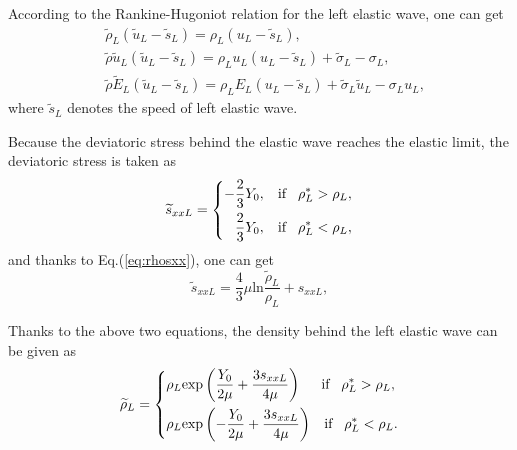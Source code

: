\documentclass[review]{elsarticle}
\begin{document}
 According to the Rankine-Hugoniot relation for the left  elastic wave, one can  get
  \begin{align}
    &\widetilde{\rho}_L(\widetilde{u}_L-\widetilde{s}_L) = \rho_L(u_L-\widetilde{s}_L), \label{eq:RHp1}\\
    &\widetilde{\rho}\widetilde{u}_L(\widetilde{u}_L-\widetilde{s}_L) = \rho_Lu_L(u_L-\widetilde{s}_L)+\widetilde{\sigma}_L-\sigma_L,  \label{eq:RHp2}\\
    &\widetilde{\rho}\widetilde{E}_L(\widetilde{u}_L-\widetilde{s}_L) = \rho_LE_L(u_L-\widetilde{s}_L)+\widetilde{\sigma}_L \widetilde{u}_L-\sigma_Lu_L, \label{eq:RHp3}
\end{align}
where $\widetilde{s}_L$ denotes the speed of left elastic wave.

Because the deviatoric stress behind the elastic wave reaches the elastic limit, the deviatoric stress is taken as
\begin{equation}
  \widetilde{s}_{xxL} =\left\{ \begin{aligned}
      -\frac{2}{3}Y_0, \hspace{0.3cm} \text{if} \hspace{0.3cm} \rho_L^* > \rho_L,\\
      \frac{2}{3}Y_0, \hspace{0.3cm} \text{if} \hspace{0.3cm} \rho_L^* < \rho_L,\\
    \end{aligned}\right.
  \end{equation}
  and thanks to Eq.(\ref{eq:rhosxx}), one can get
  \begin{equation}
	\widetilde{s}_{xxL} = \frac{4}{3}\mu \text{ln} \frac{\widetilde {\rho}_L}{\rho_L} +s_{xxL},
  \end{equation}

Thanks to the above two equations, the density behind the left elastic wave can be given as
\begin{equation}   \widetilde{\rho}_{L} = \left\{ \begin{aligned}
      & \rho_L \text{exp}\left(\frac{Y_0}{2\mu}+\frac{3 s_{xxL}}{4\mu}\right)  \hspace{0.5cm} \text{if} \hspace{0.3cm} \rho_L^* > \rho_L,\\
& \rho_L \text{exp}\left(-\frac{Y_0}{2\mu}+\frac{3 s_{xxL}}{4\mu}\right)
\hspace{0.3cm} \text{if} \hspace{0.3cm} \rho_L^* < \rho_L.\\
  \end{aligned}\right.
 \end{equation}
\end{document}
